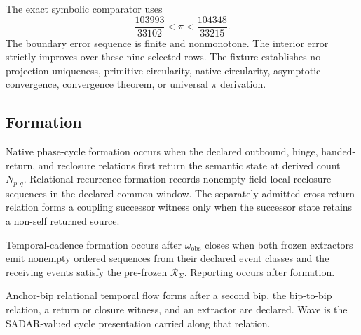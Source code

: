 The exact symbolic comparator uses
\[
\frac{103993}{33102}<\pi<\frac{104348}{33215}.
\]
The boundary error sequence is finite and nonmonotone. The interior error strictly improves over these nine selected rows. The fixture establishes no projection uniqueness, primitive circularity, native circularity, asymptotic convergence, convergence theorem, or universal \(\pi\) derivation.

\subsection{Formation}\label{manual:phase-temporal:formation}
Native phase-cycle formation occurs when the declared outbound, hinge, handed-return, and reclosure relations first return the semantic state at derived count \(N_{p:q}\). Relational recurrence formation records nonempty field-local reclosure sequences in the declared common window. The separately admitted cross-return relation forms a coupling successor witness only when the successor state retains a non-self returned source.

Temporal-cadence formation occurs after \(\omega_{\mathrm{obs}}\) closes when both frozen extractors emit nonempty ordered sequences from their declared event classes and the receiving events satisfy the pre-frozen \(\mathcal R_\Sigma\). Reporting occurs after formation.

Anchor-bip relational temporal flow forms after a second bip, the
bip-to-bip relation, a return or closure witness, and an extractor are
declared. Wave is the SADAR-valued cycle presentation carried along that
relation.

